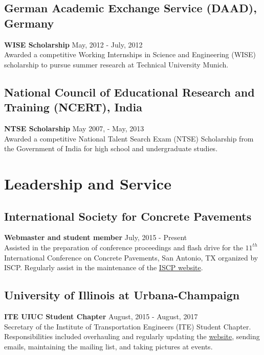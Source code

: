 \documentclass[12pt]{article}
\begin{document}
\subsection*{German Academic Exchange Service (DAAD), Germany} 
\textbf{WISE Scholarship} \hfill May, 2012 - July, 2012 \\
Awarded a competitive Working Internships in Science and Engineering (WISE) scholarship to pursue summer research at Technical University Munich. \\

\subsection*{National Council of Educational Research and Training (NCERT), India} 
\textbf{NTSE Scholarship} \hfill May 2007, - May, 2013 \\
Awarded a competitive National Talent Search Exam (NTSE) Scholarship from the Government of India for high school and undergraduate studies. \\

\section*{Leadership and Service}
\subsection*{International Society for Concrete Pavements}
\textbf{Webmaster and student member} \hfill July, 2015 - Present \\
Assisted in the preparation of conference proceedings and flash drive for the $11^{th}$ International Conference on Concrete Pavements, San Antonio, TX organized by ISCP. Regularly assist in the maintenance of the \href{concretepavements.org}{ISCP website}. \\

\subsection*{University of Illinois at Urbana-Champaign} 
\textbf{ITE UIUC Student Chapter} \hfill August, 2015 - August, 2017 \\
Secretary of the Institute of Transportation Engineers (ITE) Student Chapter. Responsibilities included overhauling and regularly updating the \href{https://iteuiuc.wordpress.com/}{website}, sending emails, maintaining the mailing list, and taking pictures at events. \\
\end{document}
